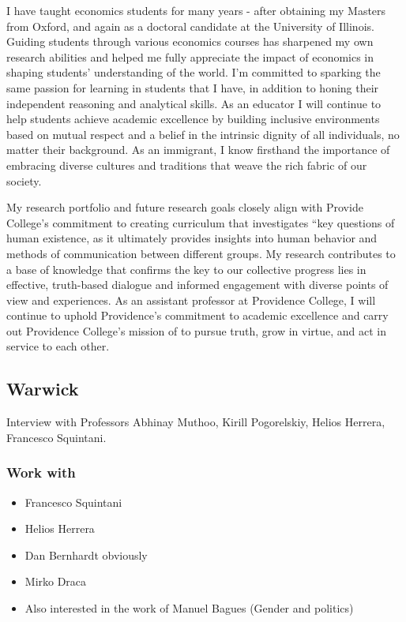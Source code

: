 \documentclass[12pt]{article}
\theoremstyle{plain}
\theoremstyle{plain}
\theoremstyle{plain}
\theoremstyle{plain}
\theoremstyle{plain}
\theoremstyle{plain}
\begin{document}
I have taught economics students for many years - after obtaining my Masters
from Oxford, and again as a doctoral candidate at the University of Illinois.
Guiding students through various economics courses has sharpened my own research
abilities and helped me fully appreciate the impact of economics in shaping
students’ understanding of the world. I’m committed to sparking the same passion
for learning in students that I have, in addition to honing their independent
reasoning and analytical skills. As an educator I will continue to help students
achieve academic excellence by building inclusive environments based on mutual
respect and a belief in the intrinsic dignity of all individuals, no matter
their background. As an immigrant, I know firsthand the importance of embracing
diverse cultures and traditions that weave the rich fabric of our society.

My research portfolio and future research goals closely align with Provide
College’s commitment to creating curriculum that investigates “key questions
of human existence, as it ultimately provides insights into human behavior
and methods of communication between different groups. My research
contributes to a base of knowledge that confirms the key to our collective
progress lies in effective, truth-based dialogue and informed engagement
with diverse points of view and experiences. As an assistant professor at
Providence College, I will continue to uphold Providence’s commitment to
academic excellence and carry out Providence College’s mission of to pursue
truth, grow in virtue, and act in service to each other.




\subsection{Warwick}
\label{sec:org3e30694}

Interview with
Professors Abhinay Muthoo, Kirill Pogorelskiy, Helios Herrera, Francesco Squintani.

\subsubsection{Work with}
\label{sec:orgf68197d}
\begin{itemize}
\item Francesco Squintani
\item Helios Herrera
\item Dan Bernhardt obviously
\item Mirko Draca
\item Also interested in the work of Manuel Bagues (Gender and politics)
\end{itemize}
\end{document}
